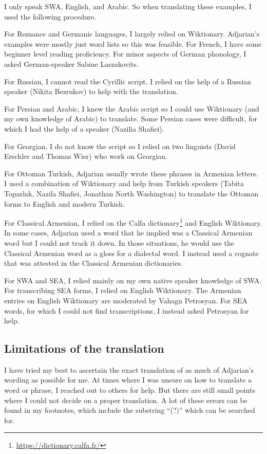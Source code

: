 \documentclass[output=paper]{langscibook}
\begin{document}
I only speak SWA, English, and Arabic. So when translating these examples, I used the following procedure. 

For Romance and Germanic languages, I largely relied on Wiktionary. Adjarian's examples were mostly just word lists so this was feasible. For French, I have some beginner level reading proficiency. For minor aspects of German phonology, I asked German-speaker Sabine  Laszakovits.

For Russian, I cannot read the Cyrillic script. I relied on the help of  a Russian speaker (Nikita Bezrukov) to help with the translation. 

For Persian and Arabic, I knew the Arabic script so I could use Wiktionary (and my own  knowledge of Arabic)  to translate. Some Persian cases were difficult, for which I had the help of a speaker (Nazilia Shafiei). 

For Georgian, I do not know the script so I relied on two linguists (David Erschler and Thomas Wier) who work on Georgian. 

For Ottoman Turkish, Adjarian usually wrote these phrases in Armenian letters. I used a combination of Wiktionary and help from Turkish speakers (Tabita Toparlak,  Nazila Shafiei, Jonathan North Washington) to translate the Ottoman forms to English and modern Turkish. 

For Classical Armenian, I relied on the Calfa dictionary\footnote{\url{https://dictionary.calfa.fr/}} and English Wiktionary. In some cases, Adjarian used a word that he implied was a Classical Armenian word but I could not track it down. In those situations, he would use the Classical Armenian  word as a gloss for a  dialectal word. I instead used a cognate that was attested in the Classical Armenian dictionaries. 

For SWA and SEA, I relied mainly on my own native speaker knowledge of SWA. For transcribing SEA forms, I relied on English Wiktionary. The Armenian entries on English Wiktionary are   moderated by Vahagn Petrosyan. For SEA words, for which I could not find transcriptions, I instead asked Petrosyan for help. 


\subsection{Limitations of the translation}\label{sec:HossepIntro:translation:limitation}
 


I have tried my best to ascertain the exact translation of as much of Adjarian's wording as possible for me. At times where I was unsure on how to translate a word or phrase, I reached out to others for help. But there are still small points where I could not decide on a proper translation. A lot of these errors can be found in   my footnotes, which include the substring ``(?)''  which  can be   searched for.
\end{document}
